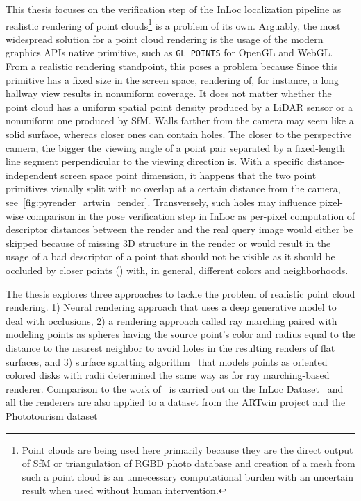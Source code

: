 This thesis focuses on the verification step of the InLoc localization pipeline
as realistic rendering of point clouds\footnote{Point clouds are being used here
primarily because they are the direct output of SfM or triangulation of RGBD photo database and creation of
a mesh from such a point cloud is an unnecessary computational burden with an uncertain result when used
without human intervention.}
is a problem of its own. Arguably, the most widespread solution
for a point cloud rendering is the usage of the modern graphics APIs native primitive, such as \verb|GL_POINTS|
for OpenGL and WebGL. From a realistic rendering standpoint, this poses a problem because  Since this primitive has a fixed
size in the screen space, rendering of, for instance, a long hallway view results in nonuniform
 coverage. It does not matter whether the point cloud has a uniform spatial point
density produced by a LiDAR sensor or a nonuniform one produced by SfM. Walls farther from the camera may seem
like a solid surface, whereas closer ones can contain holes. The closer to the perspective camera, the bigger the
viewing angle of a point pair separated by a fixed-length line segment perpendicular to the viewing direction
is. With a specific distance-independent
screen space point dimension, it happens that the two point primitives visually split with no overlap
at a certain distance from the camera, see~\cref{fig:pyrender_artwin_render}. Transversely, such holes
may influence pixel-wise comparison in the pose verification step in InLoc as per-pixel computation of
descriptor distances between the render and the real query image would either be skipped because of missing
3D structure in the render or would result in the usage of a bad descriptor of a point that should not be visible
as it should be occluded by closer points () with, in general, different colors and neighborhoods.

The thesis explores three approaches to tackle the problem of realistic point cloud rendering. 1) Neural rendering
approach that uses a deep generative model to deal with occlusions, 2) a rendering approach
called ray marching paired with modeling points as spheres having the source point's color and radius equal
to the distance to the nearest neighbor to avoid holes in the resulting renders of flat surfaces, and 3)
surface splatting algorithm~\citep{SurfaceSplatting} that models points as oriented colored disks with radii determined the same
way as for ray marching-based renderer. Comparison to the work of~\citet{Bastien} is carried out on
the InLoc Dataset~\citep{InLoc} and all the renderers are also applied to a dataset from the ARTwin
project and the Phototourism
dataset
